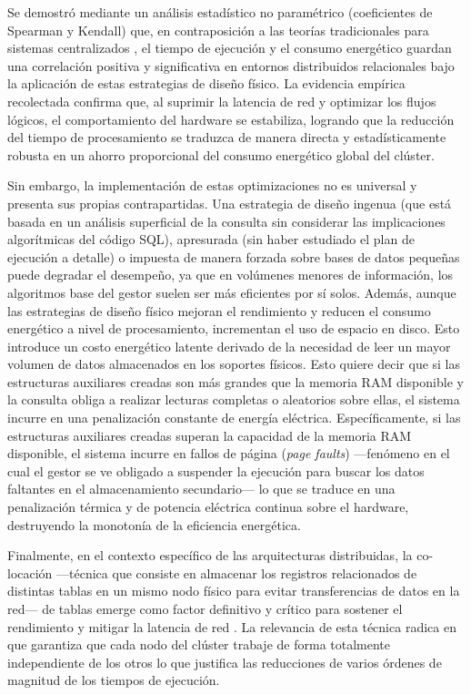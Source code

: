 \documentclass[12pt, letter paper]{report}
\begin{document}
  Se demostró mediante un análisis estadístico no paramétrico (coeficientes de
  Spearman y Kendall) que, en contraposición a las teorías tradicionales para
  sistemas centralizados \cite{niemanndoes2013}, el tiempo de ejecución y el
  consumo energético guardan una correlación positiva y significativa en
  entornos distribuidos relacionales bajo la aplicación de estas estrategias de
  diseño físico. La evidencia empírica recolectada confirma que, al suprimir la
  latencia de red y optimizar los flujos lógicos, el comportamiento del hardware
  se estabiliza, logrando que la reducción del tiempo de procesamiento se
  traduzca de manera directa y estadísticamente robusta en un ahorro
  proporcional del consumo energético global del clúster.

  Sin embargo, la implementación de estas optimizaciones no es universal y
  presenta sus propias contrapartidas. Una estrategia de diseño ingenua (que
  está basada en un análisis superficial de la consulta sin considerar las
  implicaciones algorítmicas del código SQL), apresurada (sin haber estudiado el
  plan de ejecución a detalle) o impuesta de manera forzada sobre bases de datos
  pequeñas puede degradar el desempeño, ya que en volúmenes menores de
  información, los algoritmos base del gestor suelen ser más eficientes por sí
  solos. Además, aunque las estrategias de diseño físico mejoran el rendimiento
  y reducen el consumo energético a nivel de procesamiento, incrementan el uso
  de espacio en disco. Esto introduce un costo energético latente derivado de la
  necesidad de leer un mayor volumen de datos almacenados en los soportes
  físicos. Esto quiere decir que si las estructuras auxiliares creadas son más
  grandes que la memoria RAM disponible y la consulta obliga a realizar lecturas
  completas o aleatorios sobre ellas, el sistema incurre en una penalización
  constante de energía eléctrica. Específicamente, si las estructuras auxiliares
  creadas superan la capacidad de la memoria RAM disponible, el sistema incurre
  en fallos de página (\textit{page faults}) ---fenómeno en el cual el gestor se
  ve obligado a suspender la ejecución para buscar los datos faltantes en el
  almacenamiento secundario--- lo que se traduce en una penalización térmica y
  de potencia eléctrica continua sobre el hardware, destruyendo la monotonía de
  la eficiencia energética.

  Finalmente, en el contexto específico de las arquitecturas distribuidas, la
  co-locación ---técnica que consiste en almacenar los registros relacionados de
  distintas tablas en un mismo nodo físico para evitar transferencias de datos
  en la red--- de tablas emerge como factor definitivo y crítico para sostener
  el rendimiento y mitigar la latencia de red \cite{stonebraker1986case,
  dewitt1992parallel}. La relevancia de esta técnica radica en que garantiza que
  cada nodo del clúster trabaje de forma totalmente independiente
  \cite{stonebraker1986case, dewitt1992parallel} de los otros lo que justifica
  las reducciones de varios órdenes de magnitud de los tiempos de ejecución.
\end{document}
